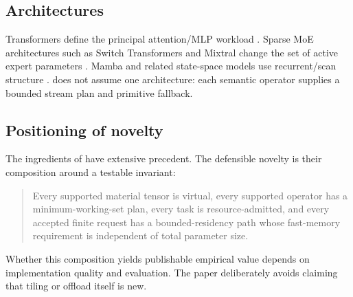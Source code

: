 \subsection{Architectures}

Transformers define the principal attention/MLP workload \cite{vaswani2017attention}. Sparse MoE architectures such as Switch Transformers and Mixtral change the set of active expert parameters \cite{fedus2021switch,jiang2024mixtral}. Mamba and related state-space models use recurrent/scan structure \cite{gu2023mamba}. \AMS does not assume one architecture: each semantic operator supplies a bounded stream plan and primitive fallback.

\subsection{Positioning of novelty}

The ingredients of \AMS have extensive precedent. The defensible novelty is their composition around a testable invariant:

\begin{quote}
Every supported material tensor is virtual, every supported operator has a minimum-working-set plan, every task is resource-admitted, and every accepted finite request has a bounded-residency path whose fast-memory requirement is independent of total parameter size.
\end{quote}

Whether this composition yields publishable empirical value depends on implementation quality and evaluation. The paper deliberately avoids claiming that tiling or offload itself is new.
